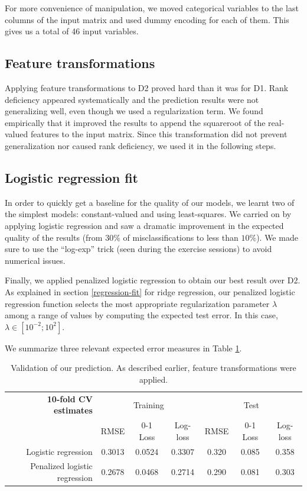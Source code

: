 \documentclass{article} %
\begin{document}
  For more convenience of manipulation, we moved categorical variables to the last columns of the input matrix and used dummy encoding for each of them. This gives us a total of 46 input variables.

  \subsection{Feature transformations}
  Applying feature transformations to D2 proved hard than it was for D1. Rank deficiency appeared systematically and the prediction results were not generalizing well, even though we used a regularization term. We found empirically that it improved the results to append the squareroot of the real-valued features to the input matrix. Since this transformation did not prevent generalization nor caused rank deficiency, we used it in the following steps.

  \subsection{Logistic regression fit}
  In order to quickly get a baseline for the quality of our models, we learnt two of the simplest models: constant-valued and using least-squares. We carried on by applying logistic regression and saw a dramatic improvement in the expected quality of the results (from $30\%$ of misclassifications to less than $10\%$). We made sure to use the ``log-exp'' trick (seen during the exercise sessions) to avoid numerical issues.

  Finally, we applied penalized logistic regression to obtain our best result over D2. As explained in section \ref{regression-fit} for ridge regression, our penalized logistic regression function selects the most appropriate regularization parameter $\lambda$ among a range of values by computing the expected test error. In this case, $\lambda \in [10^{-2}; 10^2]$.

  We summarize three relevant expected error measures in Table \ref{classifier-validation}.

  \begin{table}[ht]
    \center
    \begin{tabular}{|r|c|c|c|c|c|c|}
      \hline
      \textbf{10-fold CV estimates} & \multicolumn{3}{c|}{Training}   & \multicolumn{3}{c|}{Test}    \\
                                    & RMSE      & 0-1 Loss & Log-loss & RMSE   & 0-1 Loss & Log-loss \\
      \hline
      Logistic regression           & 0.3013    & 0.0524   & 0.3307   & 0.320  & 0.085    & 0.358    \\
      \hline
      Penalized logistic regression & 0.2678    & 0.0468   & 0.2714   & 0.290  & 0.081    & 0.303    \\
      \hline
    \end{tabular}
    \caption{Validation of our prediction. As described earlier, feature transformations were applied.}
    \label{classifier-validation}
  \end{table}
\end{document}
